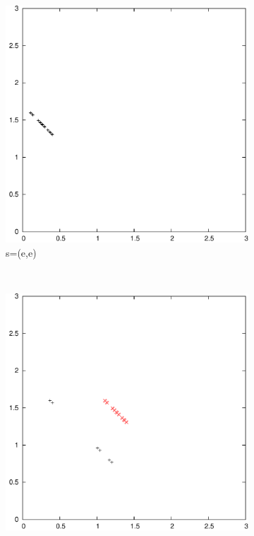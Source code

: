 \documentclass{article}
\begin{document}
	\begin{figure}
		\centering
		\begin{subfigure}[b]{0.3\textwidth}
			\centering
			\includegraphics[width=\textwidth]{images/t2s0}
			\caption{s=(e,e)}
			\label{fig:t2s0}
		\end{subfigure}
		~
		\begin{subfigure}[b]{0.3\textwidth}
			\centering
			\includegraphics[width=\textwidth]{images/t2s1}

\end{subfigure}
\end{figure}
\end{document}
